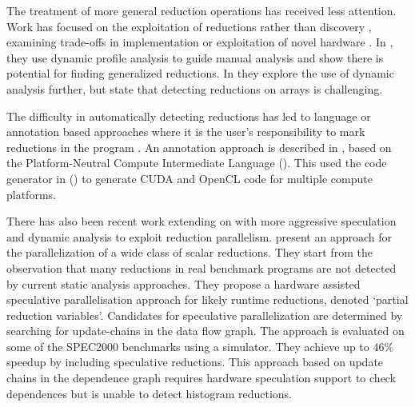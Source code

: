     The treatment of more general reduction operations has received less
    attention.
    Work has focused on the exploitation of reductions rather than discovery
    \cite{gutierrez2003optimization,gutierrez2008analytical, Gutierrez:2000},
    examining trade-offs in implementation \cite{yu2006adaptive} or exploitation
    of novel hardware \cite{ravi2010compiler,Huo2011HiPC}.
    In \cite{das2010experiences}, they use dynamic profile analysis to guide
    manual analysis and show there is potential for finding generalized
    reductions.
    In \cite{kim2012dynamic} they explore the use of dynamic analysis further,
    but state that detecting reductions on arrays is challenging.

    The difficulty in automatically detecting reductions has led to language or
    annotation based approaches where it is the user's responsibility to mark
    reductions in the program \cite{deitz2002high}.
    An annotation approach is described in \cite{Reddy2016Reduction}, based on
    the Platform-Neutral Compute Intermediate Language
    (\cite{baghdadi2015PENCIL}).
    This used the code generator in
    (\cite{Verdoolaege:2013:PPC:2400682.2400713}) to generate CUDA and OpenCL
    code for multiple compute platforms.

    There has also been recent work extending on \citet{rauchwerger1999lrpd}
    with more aggressive speculation and dynamic analysis
    \citep{aguilar2015unified} to exploit reduction parallelism.
    \citet{Han2010Speculative} present an approach for the
    parallelization of a wide class of scalar reductions.
    They start from the observation that many reductions in real benchmark
    programs are not detected by current static analysis approaches.
    They propose a hardware assisted speculative parallelisation approach for
    likely runtime reductions, denoted `partial reduction variables'.
    Candidates for speculative parallelization are determined by searching for
    update-chains in the data flow graph.
    The approach is evaluated on some of the SPEC2000 benchmarks using a
    simulator.
    They achieve up to $46\%$ speedup by including speculative reductions.
    This approach
    based on update chains in the dependence graph requires hardware
    speculation support to check dependences but is unable to detect
    histogram reductions.

